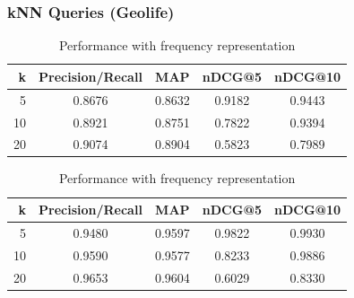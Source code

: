 \documentclass{beamer}
\begin{document}
\begin{frame}
\frametitle{kNN Queries (Geolife)} 
\begin{block}{} \vspace{-3mm}
\begin{table}[!htbp]
{\footnotesize
\centering
\begin{tabular}{rcccc}
 	{\bf k } 	& {\bf Precision/Recall}	&	{\bf MAP}	 & {\bf nDCG@5}	& {\bf nDCG@10} \\ \midrule
 	 5   		& 	0.8676   			&	0.8632	& 0.9182		& 0.9443	\\ \midrule
	10   		& 	0.8921    		 	&	0.8751	& 0.7822		& 0.9394	\\ \midrule
 	20  		&   	0.9074   			&	0.8904	& 0.5823  		& 0.7989	\\ \bottomrule\end{tabular} 
\caption{\footnotesize Performance with binary representation} \vspace{3mm}

\centering
\begin{tabular}{rcccc}
 	{\bf k } 	& {\bf Precision/Recall}	&	{\bf MAP}	 & {\bf nDCG@5}	& {\bf nDCG@10} \\ \midrule
 	 5   		& 	0.9480   		 	&	0.9597	 & 0.9822			& 0.9930	\\ \midrule
	10   		& 	0.9590    		 	&	0.9577	 & 0.8233			& 0.9886	\\ \midrule
 	20  		&   	0.9653   			&	0.9604	 & 0.6029  		& 0.8330	\\ \bottomrule
\end{tabular} 
\caption{\footnotesize Performance with frequency representation}
\label{table: Geolife binary} 
}
\end{table}
\end{block}
\end{frame}
\end{document}
